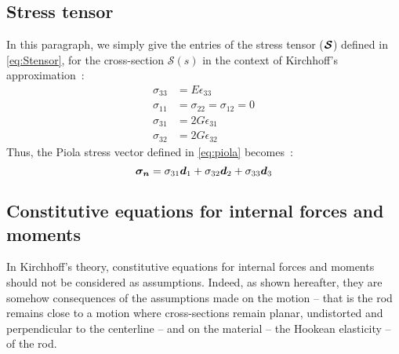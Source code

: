 \subsection{Stress tensor}
In this paragraph, we simply give the entries of the stress tensor ($\boldsymbol{\mathcal{S}}$) defined in \cref{eq:Stensor}, for the cross-section $\mathcal{S}(s)$ in the context of Kirchhoff's approximation~: 
\begin{subequations}
	\begin{alignat}{1}
	\sigma_{33} &= E \epsilon_{33} \label{eq:stress_a}
	\\
	\sigma_{11} &=  \sigma_{22} = \sigma_{12} = 0 \label{eq:stress_b}
	\\
	\sigma_{31} &= 2G \epsilon_{31}	\label{eq:stress_c}
	\\
	\sigma_{32} &= 2G \epsilon_{32}	\label{eq:stress_d}
	\end{alignat}
\end{subequations}
Thus, the Piola stress vector defined in \cref{eq:piola} becomes~:
\begin{equation}
	\boldsymbol{\sigma_n} = \sigma_{31}\boldsymbol{d}_1 + \sigma_{32}\boldsymbol{d}_2 + \sigma_{33}\boldsymbol{d}_3 \label{eq:piola2}
\end{equation}

\subsection{Constitutive equations for internal forces and moments}\label{sec:constit}
In Kirchhoff's theory, constitutive equations for internal forces and moments should not be considered as assumptions. Indeed, as shown hereafter, they are somehow consequences of the assumptions made on the motion -- that is the rod remains close to a motion where cross-sections remain planar, undistorted and perpendicular to the centerline -- and on the material -- the Hookean elasticity -- of the rod.

